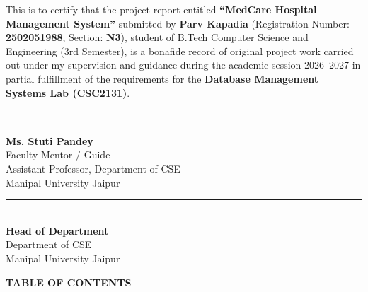\documentclass[12pt,a4paper]{article}
\begin{document}
\noindent This is to certify that the project report entitled \textbf{``MedCare Hospital Management System''} submitted by \textbf{Parv Kapadia} (Registration Number: \textbf{2502051988}, Section: \textbf{N3}), student of B.Tech Computer Science and Engineering (3rd Semester), is a bonafide record of original project work carried out under my supervision and guidance during the academic session 2026--2027 in partial fulfillment of the requirements for the \textbf{Database Management Systems Lab (CSC2131)}.

\vspace{2.8cm}

\noindent
\begin{minipage}[t]{0.48\textwidth}
    \rule{6.0cm}{0.5pt}\\
    \textbf{Ms. Stuti Pandey}\\
    Faculty Mentor / Guide\\
    Assistant Professor, Department of CSE\\
    Manipal University Jaipur
\end{minipage}
\hfill
\begin{minipage}[t]{0.45\textwidth}
    \raggedleft
    \rule{6.0cm}{0.5pt}\\
    \textbf{Head of Department}\\
    Department of CSE\\
    Manipal University Jaipur
\end{minipage}

\newpage

\thispagestyle{plain}
\begin{center}
    {\Large \textbf{TABLE OF CONTENTS}}\\[0.5cm]
\end{center}
\end{document}
